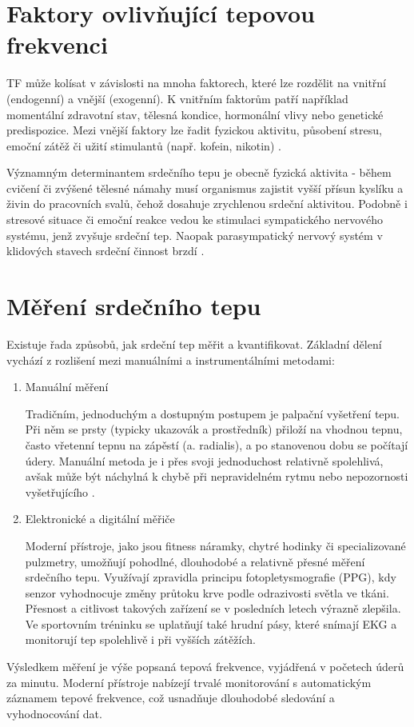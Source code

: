 \section{Faktory ovlivňující tepovou frekvenci}

\acs{TF} může kolísat v závislosti na mnoha faktorech, které lze rozdělit na vnitřní (endogenní) a vnější (exogenní).
K vnitřním faktorům patří například momentální zdravotní stav, tělesná kondice, hormonální vlivy nebo genetické predispozice.
Mezi vnější faktory lze řadit fyzickou aktivitu, působení stresu, emoční zátěž či užití stimulantů (např. kofein, nikotin) \cite{faktoryOvlivnujiciTep}.

Významným determinantem srdečního tepu je obecně fyzická aktivita - během cvičení či zvýšené tělesné námahy musí organismus zajistit vyšší přísun kyslíku a živin do pracovních svalů, čehož dosahuje zrychlenou srdeční aktivitou.
Podobně i stresové situace či emoční reakce vedou ke stimulaci sympatického nervového systému, jenž zvyšuje srdeční tep.
Naopak parasympatický nervový systém v klidových stavech srdeční činnost brzdí \cite{faktoryOvlivnujiciTep}.

\section{Měření srdečního tepu}

Existuje řada způsobů, jak srdeční tep měřit a kvantifikovat.
Základní dělení vychází z rozlišení mezi manuálními a instrumentálními metodami:

\begin{enumerate}
	\item Manuální měření

	Tradičním, jednoduchým a dostupným postupem je palpační vyšetření tepu.
	Při něm se prsty (typicky ukazovák a prostředník) přiloží na vhodnou tepnu, často vřetenní tepnu na zápěstí (a. radialis), a po stanovenou dobu se počítají údery.
	Manuální metoda je i přes svoji jednoduchost relativně spolehlivá, avšak může být náchylná k chybě při nepravidelném rytmu nebo nepozornosti vyšetřujícího \cite{vnitrniLekarstviVKostce}.

	\item Elektronické a digitální měřiče

	Moderní přístroje, jako jsou fitness náramky, chytré hodinky či specializované pulzmetry, umožňují pohodlné, dlouhodobé a relativně přesné měření srdečního tepu.
	Využívají zpravidla principu fotopletysmografie (PPG), kdy senzor vyhodnocuje změny průtoku krve podle odrazivosti světla ve tkáni.
	Přesnost a citlivost takových zařízení se v posledních letech výrazně zlepšila.
	Ve sportovním tréninku se uplatňují také hrudní pásy, které snímají EKG a monitorují tep spolehlivě i při vyšších zátěžích.
\end{enumerate}

Výsledkem měření je výše popsaná tepová frekvence, vyjádřená v početech úderů za minutu.
Moderní přístroje nabízejí trvalé monitorování s automatickým záznamem tepové frekvence, což usnadňuje dlouhodobé sledování a vyhodnocování dat.
